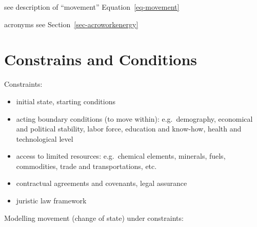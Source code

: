 \documentclass[
  letterpaper,
  DIV=11,
  numbers=noendperiod]{scrartcl}
\providecommand{\tightlist}{%
  \setlength{\itemsep}{0pt}\setlength{\parskip}{0pt}}
\begin{document}
\hfill\break
\hfill\break

see description of ``movement'' Equation~\ref{eq-movement}

acronyms see Section~\ref{sec-acroworkenergy}

\hfill\break
\hfill\break

\section{Constrains and Conditions}\label{sec-constraints}

Constraints:

\begin{itemize}
\tightlist
\item
  initial state, starting conditions
\item
  acting boundary conditions (to move within): e.g.~demography,
  economical and political stability, labor force, education and
  know-how, health and technological level
\item
  access to limited resources: e.g.~chemical elements, minerals, fuels,
  commodities, trade and transportations, etc.
\item
  contractual agreements and covenants, legal assurance
\item
  juristic law framework
\end{itemize}

Modelling movement (change of state) under constraints:
\end{document}
